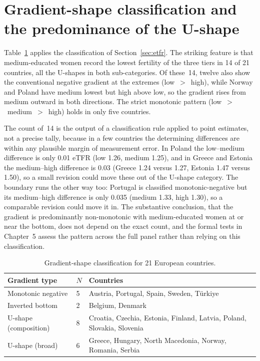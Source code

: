 \documentclass[12pt,a4paper]{report}
\begin{document}
\section{Gradient-shape classification and the predominance of the U-shape}
\label{sec:shape}
Table~\ref{tab:shapeclass} applies the classification of Section~\ref{sec:etfr}. The striking feature
is that medium-educated women record the lowest fertility of the three tiers
in 14 of 21 countries, all the U-shapes in both sub-categories. Of these~14, twelve also show the
conventional negative gradient at the extremes (low~$>$~high), while Norway and Poland have medium
lowest but high above low, so the gradient rises from medium outward in both directions. The
strict monotonic pattern (low~$>$~medium~$>$~high) holds in only five countries.

The count of~14 is the output of a classification rule applied to point estimates,
not a precise tally, because in a few countries the determining differences are
within any plausible margin of measurement error. In Poland
the low--medium difference is only 0.01 eTFR (low 1.26, medium 1.25), and in Greece and Estonia the
medium--high difference is 0.03 (Greece 1.24 versus 1.27, Estonia 1.47 versus 1.50), so a small
revision could move these out of the U-shape category. The boundary runs the other way too:
Portugal is classified monotonic-negative but its medium--high difference is only 0.035
(medium 1.33, high 1.30), so a comparable revision could move it in. The substantive conclusion, that the
gradient is predominantly non-monotonic with medium-educated women at or near the bottom, does not
depend on the exact count, and the formal tests in Chapter~5 assess the pattern across the full panel
rather than relying on this classification.

\begin{table}[ht]
\centering
\caption{Gradient-shape classification for 21 European countries.}
\label{tab:shapeclass}
\small
\begin{tabular}{@{}llp{8.4cm}@{}}
\toprule
Gradient type & $N$ & Countries \\
\midrule
Monotonic negative & 5 & Austria, Portugal, Spain, Sweden, T\"urkiye \\
Inverted bottom & 2 & Belgium, Denmark \\
U-shape (composition) & 8 & Croatia, Czechia, Estonia, Finland, Latvia, Poland, Slovakia, Slovenia \\
U-shape (broad) & 6 & Greece, Hungary, North Macedonia, Norway, Romania, Serbia \\
\bottomrule
\end{tabular}
\end{table}
\end{document}

